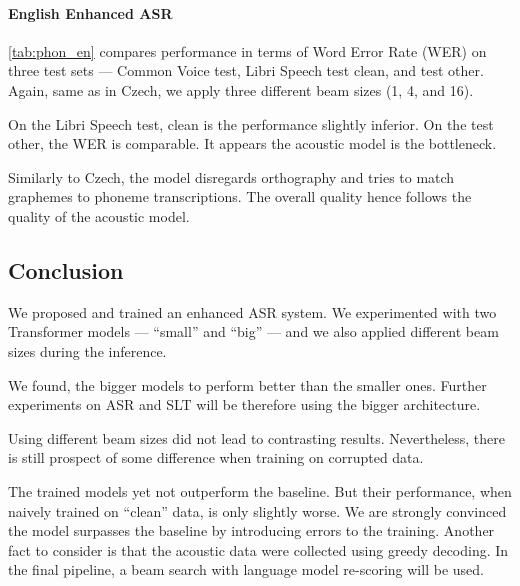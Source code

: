 \paragraph{English Enhanced ASR}
\cref{tab:phon_en} compares performance in terms of Word Error Rate (WER) on three test sets --- Common Voice test, Libri Speech test clean, and test other. Again, same as in Czech, we apply three different beam sizes (1, 4, and 16).

On the Libri Speech test, clean is the performance slightly inferior. On the test other, the WER is comparable. It appears the acoustic model is the bottleneck. 

Similarly to Czech, the model disregards orthography and tries to match graphemes to phoneme transcriptions. The overall quality hence follows the quality of the acoustic model.

\subsection{Conclusion}
\label{easr:conclusion}
We proposed and trained an enhanced ASR system. We experimented with two Transformer models --- ``small'' and ``big'' --- and we also applied different beam sizes during the inference. 

We found, the bigger models to perform better than the smaller ones. Further experiments on ASR and SLT will be therefore using the bigger architecture.

Using different beam sizes did not lead to contrasting results. Nevertheless, there is still prospect of some difference when training on corrupted data.

The trained models yet not outperform the baseline. But their performance, when naively trained on ``clean'' data, is only slightly worse. We are strongly convinced the model surpasses the baseline by introducing errors to the training. Another fact to consider is that the acoustic data were collected using greedy decoding. In the final pipeline, a beam search with language model re-scoring will be used. 
